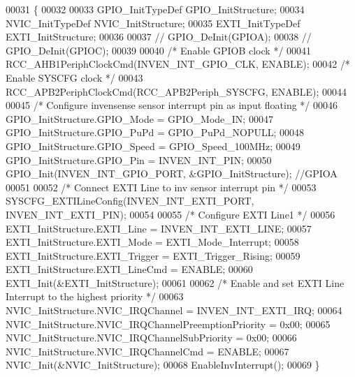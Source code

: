 \begin{DoxyCode}
00031 \{
00032 
00033   GPIO_InitTypeDef   GPIO\_InitStructure;
00034   NVIC_InitTypeDef   NVIC_InitStructure;
00035   EXTI_InitTypeDef   EXTI\_InitStructure;
00036 
00037 \textcolor{comment}{//  GPIO\_DeInit(GPIOA);}
00038 \textcolor{comment}{//  GPIO\_DeInit(GPIOC);}
00039   
00040   \textcolor{comment}{/* Enable GPIOB clock */}
00041   RCC_AHB1PeriphClockCmd(INVEN_INT_GPIO_CLK, ENABLE);
00042   \textcolor{comment}{/* Enable SYSCFG clock */}
00043   RCC_APB2PeriphClockCmd(RCC_APB2Periph_SYSCFG, ENABLE);
00044   
00045   \textcolor{comment}{/* Configure invensense sensor interrupt pin as input floating */}
00046   GPIO\_InitStructure.GPIO_Mode = GPIO_Mode_IN;
00047   GPIO\_InitStructure.GPIO_PuPd = GPIO_PuPd_NOPULL;
00048   GPIO\_InitStructure.GPIO_Speed = GPIO_Speed_100MHz;
00049   GPIO\_InitStructure.GPIO_Pin = INVEN_INT_PIN;
00050   GPIO_Init(INVEN_INT_GPIO_PORT, &GPIO\_InitStructure); \textcolor{comment}{//GPIOA}
00051 
00052   \textcolor{comment}{/* Connect EXTI Line to inv sensor interrupt pin */}
00053   SYSCFG_EXTILineConfig(INVEN_INT_EXTI_PORT, INVEN_INT_EXTI_PIN);
00054 
00055   \textcolor{comment}{/* Configure EXTI Line1 */}
00056   EXTI\_InitStructure.EXTI_Line = INVEN_INT_EXTI_LINE;
00057   EXTI\_InitStructure.EXTI_Mode = EXTI_Mode_Interrupt;
00058   EXTI\_InitStructure.EXTI_Trigger = EXTI_Trigger_Rising;
00059   EXTI\_InitStructure.EXTI_LineCmd = ENABLE;
00060   EXTI_Init(&EXTI\_InitStructure);
00061 
00062   \textcolor{comment}{/* Enable and set EXTI Line Interrupt to the highest priority */}
00063   NVIC\_InitStructure.NVIC_IRQChannel = INVEN_INT_EXTI_IRQ;
00064   NVIC\_InitStructure.NVIC_IRQChannelPreemptionPriority = 0x00;
00065   NVIC\_InitStructure.NVIC_IRQChannelSubPriority = 0x00;
00066   NVIC\_InitStructure.NVIC_IRQChannelCmd = ENABLE;
00067   NVIC_Init(&NVIC\_InitStructure);
00068   EnableInvInterrupt();
00069 \}
\end{DoxyCode}
